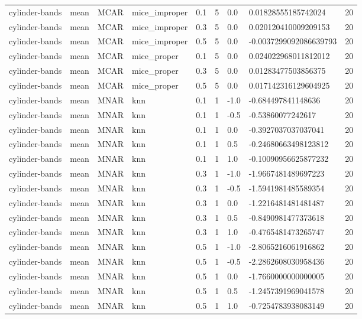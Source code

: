 \begin{tabular}{lllllllll}
cylinder-bands & mean & MCAR & mice\_improper & 0.1 & 5 & 0.0 & 0.01828555185742024 & 20 \\
cylinder-bands & mean & MCAR & mice\_improper & 0.3 & 5 & 0.0 & 0.020120410009209153 & 20 \\
cylinder-bands & mean & MCAR & mice\_improper & 0.5 & 5 & 0.0 & -0.0037299092086639793 & 20 \\
cylinder-bands & mean & MCAR & mice\_proper & 0.1 & 5 & 0.0 & 0.024022968011812012 & 20 \\
cylinder-bands & mean & MCAR & mice\_proper & 0.3 & 5 & 0.0 & 0.01283477503856375 & 20 \\
cylinder-bands & mean & MCAR & mice\_proper & 0.5 & 5 & 0.0 & 0.017142316129604925 & 20 \\
cylinder-bands & mean & MNAR & knn & 0.1 & 1 & -1.0 & -0.684497841148636 & 20 \\
cylinder-bands & mean & MNAR & knn & 0.1 & 1 & -0.5 & -0.53860077242617 & 20 \\
cylinder-bands & mean & MNAR & knn & 0.1 & 1 & 0.0 & -0.3927037037037041 & 20 \\
cylinder-bands & mean & MNAR & knn & 0.1 & 1 & 0.5 & -0.24680663498123812 & 20 \\
cylinder-bands & mean & MNAR & knn & 0.1 & 1 & 1.0 & -0.10090956625877232 & 20 \\
cylinder-bands & mean & MNAR & knn & 0.3 & 1 & -1.0 & -1.9667481489697223 & 20 \\
cylinder-bands & mean & MNAR & knn & 0.3 & 1 & -0.5 & -1.5941981485589354 & 20 \\
cylinder-bands & mean & MNAR & knn & 0.3 & 1 & 0.0 & -1.2216481481481487 & 20 \\
cylinder-bands & mean & MNAR & knn & 0.3 & 1 & 0.5 & -0.8490981477373618 & 20 \\
cylinder-bands & mean & MNAR & knn & 0.3 & 1 & 1.0 & -0.4765481473265747 & 20 \\
cylinder-bands & mean & MNAR & knn & 0.5 & 1 & -1.0 & -2.8065216061916862 & 20 \\
cylinder-bands & mean & MNAR & knn & 0.5 & 1 & -0.5 & -2.2862608030958436 & 20 \\
cylinder-bands & mean & MNAR & knn & 0.5 & 1 & 0.0 & -1.7660000000000005 & 20 \\
cylinder-bands & mean & MNAR & knn & 0.5 & 1 & 0.5 & -1.2457391969041578 & 20 \\
cylinder-bands & mean & MNAR & knn & 0.5 & 1 & 1.0 & -0.7254783938083149 & 20 \\

\end{tabular}
